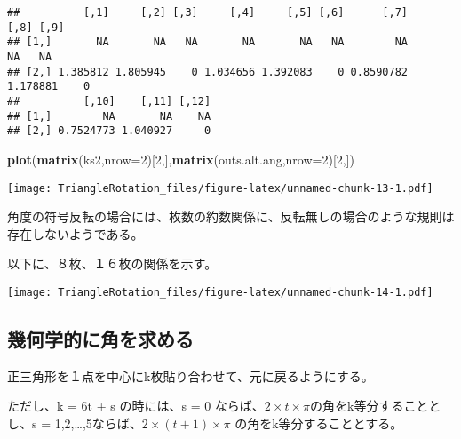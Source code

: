 \documentclass[]{article}
\newenvironment{Shaded}{\begin{snugshade}}{\end{snugshade}}
\newcommand{\KeywordTok}[1]{\textcolor[rgb]{0.13,0.29,0.53}{\textbf{#1}}}
\newcommand{\DataTypeTok}[1]{\textcolor[rgb]{0.13,0.29,0.53}{#1}}
\newcommand{\DecValTok}[1]{\textcolor[rgb]{0.00,0.00,0.81}{#1}}
\newcommand{\StringTok}[1]{\textcolor[rgb]{0.31,0.60,0.02}{#1}}
\newcommand{\OperatorTok}[1]{\textcolor[rgb]{0.81,0.36,0.00}{\textbf{#1}}}
\newcommand{\NormalTok}[1]{#1}
\begin{document}
\begin{verbatim}
##          [,1]     [,2] [,3]     [,4]     [,5] [,6]      [,7]     [,8] [,9]
## [1,]       NA       NA   NA       NA       NA   NA        NA       NA   NA
## [2,] 1.385812 1.805945    0 1.034656 1.392083    0 0.8590782 1.178881    0
##          [,10]    [,11] [,12]
## [1,]        NA       NA    NA
## [2,] 0.7524773 1.040927     0
\end{verbatim}

\begin{Shaded}
\begin{Highlighting}[]
\KeywordTok{plot}\NormalTok{(}\KeywordTok{matrix}\NormalTok{(ks2,}\DataTypeTok{nrow=}\DecValTok{2}\NormalTok{)[}\DecValTok{2}\NormalTok{,],}\KeywordTok{matrix}\NormalTok{(outs.alt.ang,}\DataTypeTok{nrow=}\DecValTok{2}\NormalTok{)[}\DecValTok{2}\NormalTok{,])}
\end{Highlighting}
\end{Shaded}

\texttt{[image: TriangleRotation\_files/figure-latex/unnamed-chunk-13-1.pdf]}

角度の符号反転の場合には、枚数の約数関係に、反転無しの場合のような規則は存在しないようである。

以下に、８枚、１６枚の関係を示す。

\begin{Shaded}
\end{Shaded}

\texttt{[image: TriangleRotation\_files/figure-latex/unnamed-chunk-14-1.pdf]}

\subsection{幾何学的に角を求める}\label{ux5e7eux4f55ux5b66ux7684ux306bux89d2ux3092ux6c42ux3081ux308b}

正三角形を１点を中心にk枚貼り合わせて、元に戻るようにする。

ただし、k = 6t + s の時には、s = 0
ならば、\(2 \times t \times \pi\)の角をk等分することとし、s =
1,2,\ldots{},5ならば、\(2 \times (t+1) \times \pi\)
の角をk等分することとする。
\end{document}
